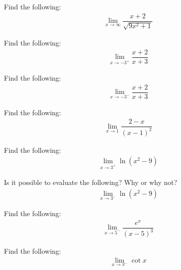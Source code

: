 \begin{exercise}
Find the following:
\begin{align*}
    \lim_{x \longrightarrow \infty} \dfrac{x+2}{\sqrt{9x^{2}+1}}
\end{align*}
\end{exercise}

\begin{exercise}
Find the following:
\begin{align*}
    \lim_{x \longrightarrow -3^{+}} \dfrac{x+2}{x+3}
\end{align*}
\end{exercise}

\begin{exercise}
Find the following:
\begin{align*}
    \lim_{x \longrightarrow -3^{-}} \dfrac{x+2}{x+3}
\end{align*}
\end{exercise}

\begin{exercise}
Find the following:
\begin{align*}
    \lim_{x \longrightarrow 1} \dfrac{2-x}{(x-1)^{2}}
\end{align*}
\end{exercise}

\begin{exercise}
Find the following:
\begin{align*}
    \lim_{x \longrightarrow 3^{+}} \ln(x^{2} - 9)
\end{align*}
\end{exercise}

\begin{exercise}
Is it possible to evaluate the following? Why or why not?
\begin{align*}
    \lim_{x \longrightarrow 3^{-}} \ln(x^{2} - 9)
\end{align*}
\end{exercise}

\begin{exercise}
Find the following:
\begin{align*}
    \lim_{x \longrightarrow 5^{-}} \dfrac{e^{x}}{(x-5)^{3}}
\end{align*}
\end{exercise}

\begin{exercise}
Find the following:
\begin{align*}
    \lim_{x \longrightarrow \pi^{-}} \cot x
\end{align*}
\end{exercise}

